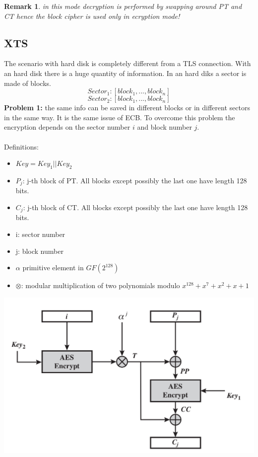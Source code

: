 \documentclass[10pt,a4paper]{article}
\newtheorem{remark}{Remark}
\begin{document}
\begin{remark}
in this mode decryption is performed by swapping around PT and CT hence the block cipher is used only in ecryption mode!
\end{remark}
\subsection{XTS}
The scenario with hard disk is completely different from a TLS connection. With an hard disk there is a huge quantity of information.
In an hard diks a sector is made of blocks.\\
$$Sector_1: [block_1, ... , block_n]$$
$$Sector_2: [block_1, ... , block_n]$$
{\bf Problem 1:} the same info can be saved in different blocks or in different sectors in the same way. It is the same issue of ECB. To overcome this problem the encryption depends on the sector number $i$ and block number $j$.\\\\
Definitions:
\begin{itemize}
\item $Key = Key_1 || Key_2$
\item $P_j$: j-th block of PT. All blocks except possibly the last one have length 128 bits.
\item $C_j$: j-th block of CT. All blocks except possibly the last one have length 128 bits.
\item i: sector number
\item j: block number
\item $\alpha$ primitive element in $GF(2^128)$
\item $\otimes$: modular multiplication of two polynomials  modulo $x^{128}+x^7+x^2+x+1$
\end{itemize}
\begin{center}
\includegraphics[scale=0.3]{img/XTS-encryption.png}
\end{center}
\end{document}

